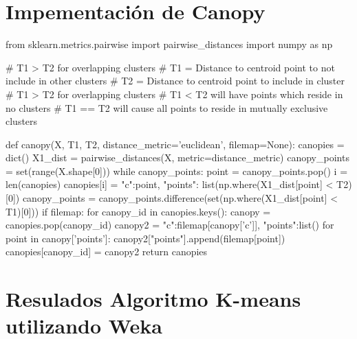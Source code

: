 \documentclass[a4paper, 12pt]{article}
\begin{document}
\newpage
\section{Impementaci\'on de Canopy} \label{App:AppendixD}

\begin{python}
from sklearn.metrics.pairwise import pairwise_distances
import numpy as np

# T1 > T2 for overlapping clusters
# T1 = Distance to centroid point to not include in other clusters
# T2 = Distance to centroid point to include in cluster
# T1 > T2 for overlapping clusters
# T1 < T2 will have points which reside in no clusters
# T1 == T2 will cause all points to reside in mutually exclusive clusters

def canopy(X, T1, T2, distance_metric='euclidean', filemap=None):
    canopies = dict()
    X1_dist = pairwise_distances(X, metric=distance_metric)
    canopy_points = set(range(X.shape[0]))
    while canopy_points:
        point = canopy_points.pop()
        i = len(canopies)
        canopies[i] = {"c":point, "points": list(np.where(X1_dist[point] < T2)[0])}
        canopy_points = canopy_points.difference(set(np.where(X1_dist[point] < T1)[0]))
    if filemap:
        for canopy_id in canopies.keys():
            canopy = canopies.pop(canopy_id)
            canopy2 = {"c":filemap[canopy['c']], "points":list()}
            for point in canopy['points']:
                canopy2["points"].append(filemap[point])
            canopies[canopy_id] = canopy2
    return canopies

\end{python}

\newpage
\section{Resulados Algoritmo K-means utilizando Weka} \label{App:AppendixE}
\end{document}

